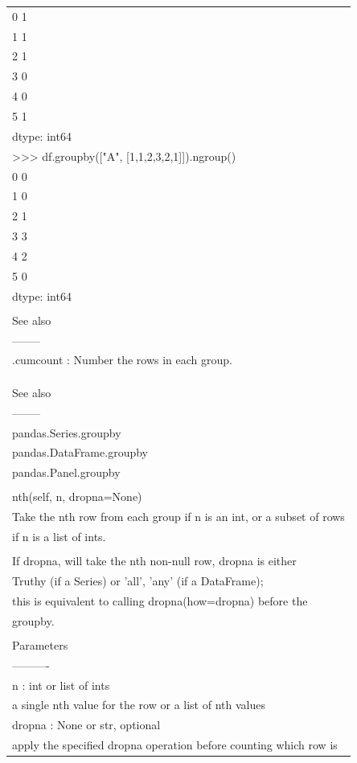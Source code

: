 \documentclass[11pt]{article}
\begin{document}
\begin{enumerate}
\begin{enumerate}
\begin{enumerate}
\begin{center}
\begin{tabular}{l}
0    1\\
1    1\\
2    1\\
3    0\\
4    0\\
5    1\\
dtype: int64\\
>>> df.groupby(["A", [1,1,2,3,2,1]]).ngroup()\\
0    0\\
1    0\\
2    1\\
3    3\\
4    2\\
5    0\\
dtype: int64\\
\\
See also\\
--------\\
.cumcount : Number the rows in each group.\\
\\
\\
\\
See also\\
--------\\
pandas.Series.groupby\\
pandas.DataFrame.groupby\\
pandas.Panel.groupby\\
\\
nth(self, n, dropna=None)\\
Take the nth row from each group if n is an int, or a subset of rows\\
if n is a list of ints.\\
\\
If dropna, will take the nth non-null row, dropna is either\\
Truthy (if a Series) or 'all', 'any' (if a DataFrame);\\
this is equivalent to calling dropna(how=dropna) before the\\
groupby.\\
\\
Parameters\\
----------\\
n : int or list of ints\\
a single nth value for the row or a list of nth values\\
dropna : None or str, optional\\
apply the specified dropna operation before counting which row is\\

\end{tabular}
\end{center}
\end{enumerate}
\end{enumerate}
\end{enumerate}
\end{document}
